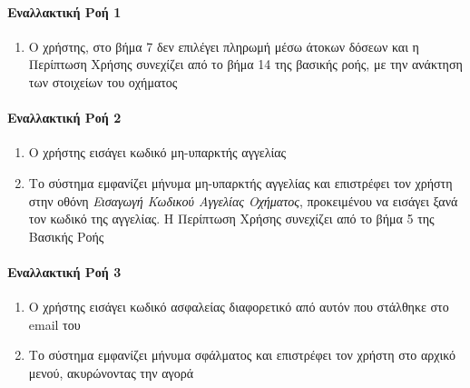 \documentclass{../ol-softwaremanual}
\begin{document}
	\paragraph{Εναλλακτική Ροή 1}
	\begin{enumerate}
		\item Ο χρήστης, στο βήμα 7 δεν επιλέγει πληρωμή μέσω άτοκων δόσεων και η Περίπτωση Χρήσης συνεχίζει από το βήμα 14 της βασικής ροής, με την ανάκτηση των στοιχείων του οχήματος
	\end{enumerate}
	
	\paragraph{Εναλλακτική Ροή 2}
	\begin{enumerate}
		\item Ο χρήστης εισάγει κωδικό μη-υπαρκτής αγγελίας
		\item Το σύστημα εμφανίζει μήνυμα μη-υπαρκτής αγγελίας και επιστρέφει τον χρήστη στην οθόνη \textit{Εισαγωγή Κωδικού Αγγελίας Οχήματος}, προκειμένου να εισάγει ξανά τον κωδικό της αγγελίας. Η Περίπτωση Χρήσης συνεχίζει από το βήμα 5 της Βασικής Ροής
	\end{enumerate}
	
	\paragraph{Εναλλακτική Ροή 3}
	\begin{enumerate}
		\item Ο χρήστης εισάγει κωδικό ασφαλείας διαφορετικό από αυτόν που στάλθηκε στο \en email \gr του
		\item Το σύστημα εμφανίζει μήνυμα σφάλματος και επιστρέφει τον χρήστη στο αρχικό μενού, ακυρώνοντας την αγορά
	\end{enumerate}
	
	
\end{document}
